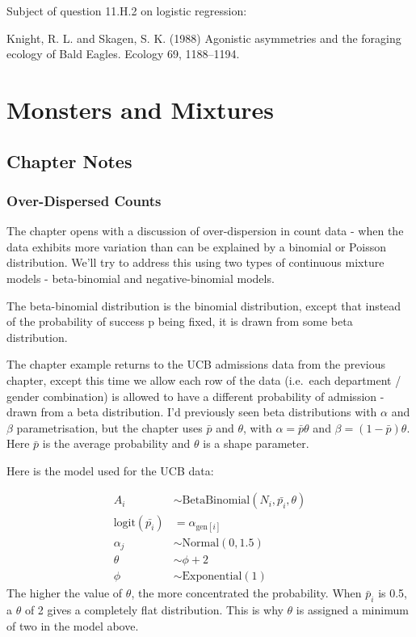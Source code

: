 \documentclass[
]{book}
\begin{document}
Subject of question 11.H.2 on logistic regression:

Knight, R. L. and Skagen, S. K. (1988) Agonistic asymmetries and the foraging ecology of Bald Eagles. Ecology 69, 1188--1194.

\hypertarget{monsters_mixtures}{%
\chapter{Monsters and Mixtures}\label{monsters_mixtures}}

\hypertarget{chapter-notes-11}{%
\section{Chapter Notes}\label{chapter-notes-11}}

\hypertarget{over-dispersed-counts}{%
\subsection*{Over-Dispersed Counts}\label{over-dispersed-counts}}

The chapter opens with a discussion of over-dispersion in count data - when the data exhibits more variation than can be explained by a binomial or Poisson distribution. We'll try to address this using two types of continuous mixture models - beta-binomial and negative-binomial models.

The beta-binomial distribution is the binomial distribution, except that instead of the probability of success p being fixed, it is drawn from some beta distribution.

The chapter example returns to the UCB admissions data from the previous chapter, except this time we allow each row of the data (i.e.~each department / gender combination) is allowed to have a different probability of admission - drawn from a beta distribution. I'd previously seen beta distributions with \(\alpha\) and \(\beta\) parametrisation, but the chapter uses \(\bar{p}\) and \(\theta\), with \(\alpha = \bar{p}\theta\) and \(\beta = (1-\bar{p})\theta\). Here \(\bar{p}\) is the average probability and \(\theta\) is a shape parameter.

Here is the model used for the UCB data:

\[
\begin{aligned}
A_i &\sim \text{BetaBinomial}(N_i,\bar{p_i},\theta) \\
\text{logit}(\bar{p_i}) &= \alpha_{\text{gen}[i]} \\
\alpha_j &\sim \text{Normal}(0,1.5) \\
\theta & \sim \phi + 2 \\
\phi & \sim \text{Exponential}(1)
\end{aligned}
\]
The higher the value of \(\theta\), the more concentrated the probability. When \(\bar{p}_i\) is 0.5, a \(\theta\) of 2 gives a completely flat distribution. This is why \(\theta\) is assigned a minimum of two in the model above.
\end{document}
